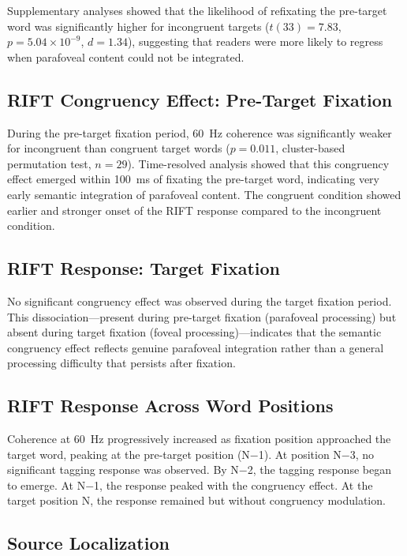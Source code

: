 \documentclass[12pt]{article}
\begin{document}
Supplementary analyses showed that the likelihood of refixating the pre-target word was significantly higher for incongruent targets ($t(33) = 7.83$, $p = 5.04 \times 10^{-9}$, $d = 1.34$), suggesting that readers were more likely to regress when parafoveal content could not be integrated.

\subsection{RIFT Congruency Effect: Pre-Target Fixation}

During the pre-target fixation period, 60~Hz coherence was significantly weaker for incongruent than congruent target words ($p = 0.011$, cluster-based permutation test, $n = 29$). Time-resolved analysis showed that this congruency effect emerged within 100~ms of fixating the pre-target word, indicating very early semantic integration of parafoveal content. The congruent condition showed earlier and stronger onset of the RIFT response compared to the incongruent condition.

\subsection{RIFT Response: Target Fixation}

No significant congruency effect was observed during the target fixation period. This dissociation---present during pre-target fixation (parafoveal processing) but absent during target fixation (foveal processing)---indicates that the semantic congruency effect reflects genuine parafoveal integration rather than a general processing difficulty that persists after fixation.

\subsection{RIFT Response Across Word Positions}

Coherence at 60~Hz progressively increased as fixation position approached the target word, peaking at the pre-target position (N$-$1). At position N$-$3, no significant tagging response was observed. By N$-$2, the tagging response began to emerge. At N$-$1, the response peaked with the congruency effect. At the target position N, the response remained but without congruency modulation.

\subsection{Source Localization}
\end{document}
